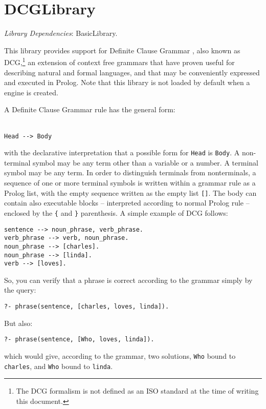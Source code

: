 \clearpage

\section{DCGLibrary}

\noindent \emph{Library Dependencies}: BasicLibrary.

This library provides support for Definite Clause Grammar
\cite{bra00}, also known as DCG,\footnote{The DCG formalism is not
defined as an ISO standard at the time of writing this document.} an
extension of context free grammars that have proven useful for
describing natural and formal languages, and that may be
conveniently expressed and executed in Prolog.
%
Note that this library is not loaded by default when a \tuprolog{}
engine is created.

A Definite Clause Grammar rule has the general form:\\\\
%
\begin{verbatim}
Head --> Body
\end{verbatim}
%
with the declarative interpretation that a possible form for \texttt{Head}
is \texttt{Body}.
%
A non-terminal symbol may be any term other than a variable or a
number.
%
A terminal symbol may be any term. In order to distinguish
terminals from nonterminals, a sequence of one or more terminal
symbols  is written within a grammar rule as a Prolog list, with the
empty sequence written as the empty list \verb|[]|.
%
The body can contain also executable blocks -- interpreted
according to normal Prolog rule -- enclosed by the \verb|{| and
\verb|}| parenthesis.
%
A simple example of DCG follows:
%
\begin{verbatim}
sentence --> noun_phrase, verb_phrase.
verb_phrase --> verb, noun_phrase.
noun_phrase --> [charles].
noun_phrase --> [linda].
verb --> [loves].
\end{verbatim}
%
So, you can verify that a phrase is correct according to
the grammar simply by the query:
%
\begin{verbatim}
?- phrase(sentence, [charles, loves, linda]).
\end{verbatim}
%
But also:
%
\begin{verbatim}
?- phrase(sentence, [Who, loves, linda]).
\end{verbatim}
%
which would give, according to the grammar, two solutions,
\texttt{Who} bound to \texttt{charles}, and \texttt{Who} bound to
\texttt{linda}.

